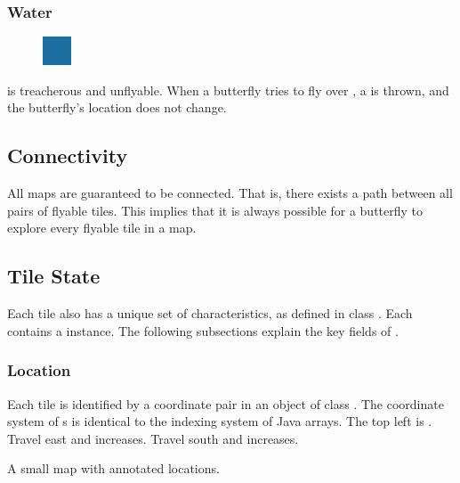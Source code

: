 \documentclass{pset}
\begin{document}
\subsubsection{Water}
\begin{figure}
    \centering
    \vspace{-20pt}
    \includegraphics{img/water.png}
    \vspace{-20pt}
\end{figure}
 is treacherous and unflyable. When a butterfly tries to fly over
, a  is thrown, and the butterfly's
location does not change.
\fi

\ifx \CONNECTIVITY \undefined \else
\subsection{Connectivity}
All maps are guaranteed to be connected. That is, there exists a path between
all pairs of flyable tiles. This implies that it is always possible for a
butterfly to explore every flyable tile in a map.
\fi

\ifx \TILESTATE \undefined \else
\subsection{Tile State}
Each tile also has a unique set of characteristics, as defined in class
. Each  contains a  instance. The
following subsections explain the key fields of .

\subsubsection{Location}
Each tile is identified by a  coordinate pair in an object of
class . The coordinate system of s is identical
to the indexing system of Java arrays. The top left  is
\java{[0,0]}. Travel east and  increases. Travel south and 
increases.

\begin{table}[H]
  \centering
  \caption{A small map with annotated locations.}
  \label{table:location}
\end{table}
\end{document}
